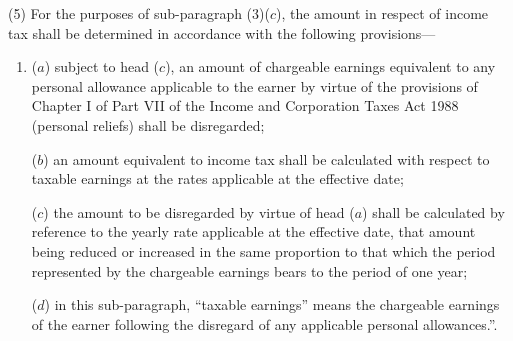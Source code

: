 \documentclass[12pt,a4paper]{article}
\begin{document}
%

(5) For the purposes of sub-paragraph (3)($c$), the amount in respect of income tax shall be determined in accordance with the following provisions—
\begin{enumerate}\item[]
($a$) subject to head ($c$), an amount of chargeable earnings equivalent to any personal allowance applicable to the earner by virtue of the provisions of Chapter I of Part VII of the Income and Corporation Taxes Act 1988 (personal reliefs) shall be disregarded;

($b$) an amount equivalent to income tax shall be calculated with respect to taxable earnings at the rates applicable at the effective date;

($c$) the amount to be disregarded by virtue of head ($a$) shall be calculated by reference to the yearly rate applicable at the effective date, that amount being reduced or increased in the same proportion to that which the period represented by the chargeable earnings bears to the period of one year;

($d$) in this sub-paragraph, “taxable earnings” means the chargeable earnings of the earner following the disregard of any applicable personal allowances.”.
\end{enumerate}
\end{document}
